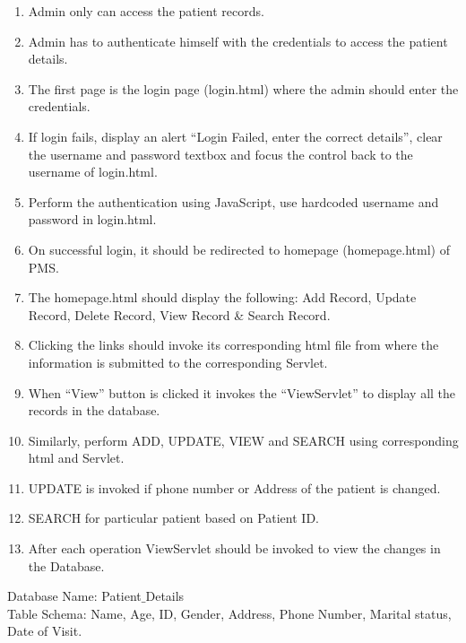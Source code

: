 \documentclass[12pt, a4]{article}
\begin{document}
\begin{flushleft}
\begin{enumerate}
\item Admin only can access the patient records.
\item Admin has to authenticate himself with the credentials to access the
patient details.
\item The first page is the login page (login.html) where the admin should
enter the credentials.
\item If login fails, display an alert “Login Failed, enter the correct details”, clear the username and password textbox and focus the control back
to the username of login.html.
\item Perform the authentication using JavaScript, use hardcoded username
and password in login.html.
\item On successful login, it should be redirected to homepage
(homepage.html) of PMS.
\item The homepage.html should display the following: Add Record, Update Record, Delete Record, View Record \& Search Record.
\item Clicking the links should invoke its corresponding html file from where
the information is submitted to the corresponding Servlet.
\item When “View” button is clicked it invokes the “ViewServlet” to display all
the records in the database.
\item Similarly, perform ADD, UPDATE, VIEW and SEARCH using corresponding
html and Servlet.
\item UPDATE is invoked if phone number or Address of the patient is
changed.
\item SEARCH for particular patient based on Patient ID.
\item After each operation ViewServlet should be invoked to view the changes
in the Database.
\end{enumerate}

Database Name: Patient$\_$Details\\
Table Schema: Name, Age, ID, Gender, Address, Phone Number, Marital status, Date of Visit.
 
\end{flushleft}

\newpage
\subsection*{}
\begin{flushleft}

\end{flushleft}
\end{document}
